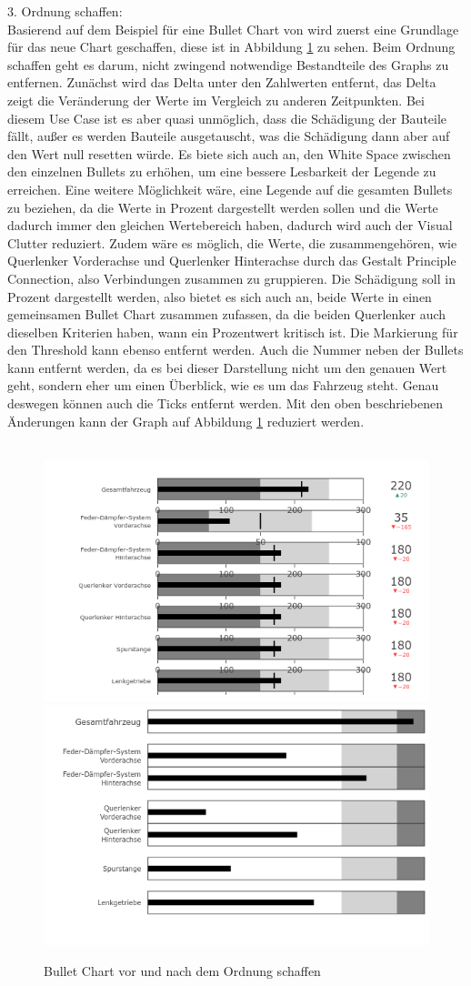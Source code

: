 3. Ordnung schaffen:\\
Basierend auf dem Beispiel für eine Bullet Chart von \cite{Plotly.2024c} wird zuerst eine Grundlage für das neue Chart geschaffen, diese ist in Abbildung \ref{fig:bullet_chart_after} zu sehen.
Beim Ordnung schaffen geht es darum, nicht zwingend notwendige Bestandteile des Graphs zu entfernen. Zunächst wird das Delta unter den Zahlwerten entfernt, das Delta zeigt die Veränderung der Werte im Vergleich zu anderen Zeitpunkten. Bei diesem Use Case ist es aber quasi unmöglich, dass die Schädigung der Bauteile fällt, außer es werden Bauteile ausgetauscht, was die Schädigung dann aber auf den Wert null resetten würde. Es biete sich auch an, den White Space zwischen den einzelnen Bullets zu erhöhen, um eine bessere Lesbarkeit der Legende zu erreichen. Eine weitere Möglichkeit wäre, eine Legende auf die gesamten Bullets zu beziehen, da die Werte in Prozent dargestellt werden sollen und die Werte dadurch immer den gleichen Wertebereich haben, dadurch wird auch der Visual Clutter reduziert. Zudem wäre es möglich, die Werte, die \glqq zusammengehören\grqq{}, wie Querlenker Vorderachse und Querlenker Hinterachse durch das Gestalt Principle  \cite{Schwabish.2021} Connection, also Verbindungen zusammen zu gruppieren. Die Schädigung soll in Prozent dargestellt werden, also bietet es sich auch an, beide Werte in einen gemeinsamen Bullet Chart zusammen zufassen, da die beiden Querlenker auch dieselben Kriterien haben, wann ein Prozentwert kritisch ist. Die Markierung für den Threshold kann ebenso entfernt werden. Auch die Nummer neben der Bullets kann entfernt werden, da es bei dieser Darstellung nicht um den genauen Wert geht, sondern eher um einen Überblick, wie es um das Fahrzeug steht. Genau deswegen können auch die Ticks entfernt werden. Mit den oben beschriebenen Änderungen kann der Graph auf Abbildung \ref{fig:bullet_chart_after} reduziert werden.\\\\
\begin{figure}
\centering
\includegraphics[width=.45\textwidth]{gfx/Bullet_Chart_Before.png} %
\includegraphics[width=.45\textwidth]{gfx/Bullet_Chart_After.png}
\caption{Bullet Chart vor und nach dem Ordnung schaffen}
\label{fig:bullet_chart_after}
\end{figure}
